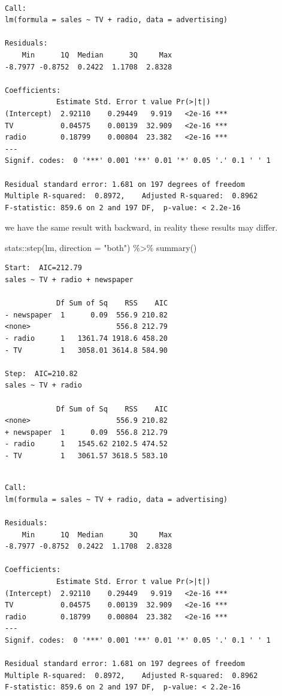 \documentclass[
  letterpaper,
  DIV=11,
  numbers=noendperiod]{scrreprt}
\newenvironment{Shaded}{\begin{snugshade}}{\end{snugshade}}
\newcommand{\AttributeTok}[1]{\textcolor[rgb]{0.65,0.35,0.00}{#1}}
\newcommand{\FunctionTok}[1]{\textcolor[rgb]{0.02,0.16,0.49}{#1}}
\newcommand{\NormalTok}[1]{\textcolor[rgb]{0.33,0.33,0.33}{#1}}
\newcommand{\SpecialCharTok}[1]{\textcolor[rgb]{0.00,0.46,0.62}{#1}}
\newcommand{\StringTok}[1]{\textcolor[rgb]{0.00,0.50,0.00}{#1}}
\begin{document}
\begin{verbatim}

Call:
lm(formula = sales ~ TV + radio, data = advertising)

Residuals:
    Min      1Q  Median      3Q     Max 
-8.7977 -0.8752  0.2422  1.1708  2.8328 

Coefficients:
            Estimate Std. Error t value Pr(>|t|)    
(Intercept)  2.92110    0.29449   9.919   <2e-16 ***
TV           0.04575    0.00139  32.909   <2e-16 ***
radio        0.18799    0.00804  23.382   <2e-16 ***
---
Signif. codes:  0 '***' 0.001 '**' 0.01 '*' 0.05 '.' 0.1 ' ' 1

Residual standard error: 1.681 on 197 degrees of freedom
Multiple R-squared:  0.8972,    Adjusted R-squared:  0.8962 
F-statistic: 859.6 on 2 and 197 DF,  p-value: < 2.2e-16
\end{verbatim}

we have the same result with backward, in reality these results may
differ.

\begin{Shaded}
\begin{Highlighting}[]
\NormalTok{stats}\SpecialCharTok{::}\FunctionTok{step}\NormalTok{(lm, }\AttributeTok{direction =} \StringTok{"both"}\NormalTok{) }\SpecialCharTok{\%\textgreater{}\%} \FunctionTok{summary}\NormalTok{() }
\end{Highlighting}
\end{Shaded}

\begin{verbatim}
Start:  AIC=212.79
sales ~ TV + radio + newspaper

            Df Sum of Sq    RSS    AIC
- newspaper  1      0.09  556.9 210.82
<none>                    556.8 212.79
- radio      1   1361.74 1918.6 458.20
- TV         1   3058.01 3614.8 584.90

Step:  AIC=210.82
sales ~ TV + radio

            Df Sum of Sq    RSS    AIC
<none>                    556.9 210.82
+ newspaper  1      0.09  556.8 212.79
- radio      1   1545.62 2102.5 474.52
- TV         1   3061.57 3618.5 583.10
\end{verbatim}

\begin{verbatim}

Call:
lm(formula = sales ~ TV + radio, data = advertising)

Residuals:
    Min      1Q  Median      3Q     Max 
-8.7977 -0.8752  0.2422  1.1708  2.8328 

Coefficients:
            Estimate Std. Error t value Pr(>|t|)    
(Intercept)  2.92110    0.29449   9.919   <2e-16 ***
TV           0.04575    0.00139  32.909   <2e-16 ***
radio        0.18799    0.00804  23.382   <2e-16 ***
---
Signif. codes:  0 '***' 0.001 '**' 0.01 '*' 0.05 '.' 0.1 ' ' 1

Residual standard error: 1.681 on 197 degrees of freedom
Multiple R-squared:  0.8972,    Adjusted R-squared:  0.8962 
F-statistic: 859.6 on 2 and 197 DF,  p-value: < 2.2e-16
\end{verbatim}
\end{document}
